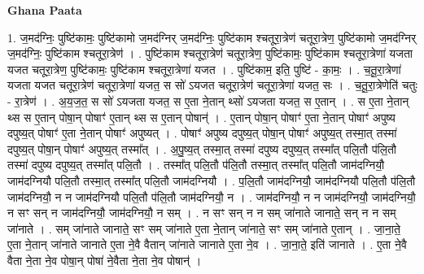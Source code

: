 \documentclass[17pt]{extarticle}
\begin{document}
\textbf{Ghana Paata } \newline

1. ज॒मद॑ग्निः॒ पुष्टि॑कामः॒ पुष्टि॑कामो ज॒मद॑ग्निर् ज॒मद॑ग्निः॒ पुष्टि॑काम श्चतूरा॒त्रेण॑ चतूरा॒त्रेण॒ पुष्टि॑कामो ज॒मद॑ग्निर् ज॒मद॑ग्निः॒ पुष्टि॑काम श्चतूरा॒त्रेण॑ । . पुष्टि॑काम श्चतूरा॒त्रेण॑ चतूरा॒त्रेण॒ पुष्टि॑कामः॒ पुष्टि॑काम श्चतूरा॒त्रेणा॑ यजता यजत चतूरा॒त्रेण॒ पुष्टि॑कामः॒ पुष्टि॑काम श्चतूरा॒त्रेणा॑ यजत । . पुष्टि॑काम॒ इति॒ पुष्टि॑ - का॒मः॒ । . च॒तू॒रा॒त्रेणा॑ यजता यजत चतूरा॒त्रेण॑ चतूरा॒त्रेणा॑ यजत॒ स सो॑ ऽयजत चतूरा॒त्रेण॑ चतूरा॒त्रेणा॑ यजत॒ सः । . च॒तू॒रा॒त्रेणेति॑ चतुः - रा॒त्रेण॑ । . अ॒य॒ज॒त॒ स सो॑ ऽयजता यजत॒ स ए॒ता ने॒तान् थ्सो॑ ऽयजता यजत॒ स ए॒तान् । . स ए॒ता ने॒तान् थ्स स ए॒तान् पोषा॒न् पोषाꣳ॑ ए॒तान् थ्स स ए॒तान् पोषान्॑ । . ए॒तान् पोषा॒न् पोषाꣳ॑ ए॒ता ने॒तान् पोषाꣳ॑ अपुष्य दपुष्य॒त् पोषाꣳ॑ ए॒ता ने॒तान् पोषाꣳ॑ अपुष्यत् । . पोषाꣳ॑ अपुष्य दपुष्य॒त् पोषा॒न् पोषाꣳ॑ अपुष्य॒त् तस्मा॒त् तस्मा॑ दपुष्य॒त् पोषा॒न् पोषाꣳ॑ अपुष्य॒त् तस्मा᳚त् । . अ॒पु॒ष्य॒त् तस्मा॒त् तस्मा॑ दपुष्य दपुष्य॒त् तस्मा᳚त् पलि॒तौ प॑लि॒तौ तस्मा॑ दपुष्य दपुष्य॒त् तस्मा᳚त् पलि॒तौ । . तस्मा᳚त् पलि॒तौ प॑लि॒तौ तस्मा॒त् तस्मा᳚त् पलि॒तौ जाम॑दग्नियौ॒ जाम॑दग्नियौ पलि॒तौ तस्मा॒त् तस्मा᳚त् पलि॒तौ जाम॑दग्नियौ । . प॒लि॒तौ जाम॑दग्नियौ॒ जाम॑दग्नियौ पलि॒तौ प॑लि॒तौ जाम॑दग्नियौ॒ न न जाम॑दग्नियौ पलि॒तौ प॑लि॒तौ जाम॑दग्नियौ॒ न । . जाम॑दग्नियौ॒ न न जाम॑दग्नियौ॒ जाम॑दग्नियौ॒ न सꣳ सन् न जाम॑दग्नियौ॒ जाम॑दग्नियौ॒ न सम् । . न सꣳ सन् न न सम् जा॑नाते जानाते॒ सन् न न सम् जा॑नाते । . सम् जा॑नाते जानाते॒ सꣳ सम् जा॑नाते ए॒ता ने॒तान् जा॑नाते॒ सꣳ सम् जा॑नाते ए॒तान् । . जा॒ना॒ते॒ ए॒ता ने॒तान् जा॑नाते जानाते ए॒ता ने॒वै वैतान् जा॑नाते जानाते ए॒ता ने॒व । . जा॒ना॒ते॒ इति॑ जानाते । . ए॒ता ने॒वै वैता ने॒ता ने॒व पोषा॒न् पोषा॑ ने॒वैता ने॒ता ने॒व पोषान्॑ । \newline
\end{document}
